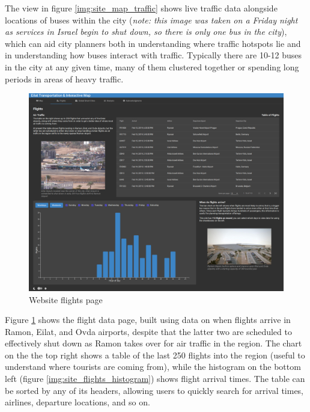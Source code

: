 \documentclass[12pt]{article}                               %
\begin{document}
The view in figure \ref{img:site_map_traffic} shows live traffic data alongside locations of buses within the city (\textit{note: this image was taken on a Friday night as services in Israel begin to shut down, so there is only one bus in the city}), which can aid city planners both in understanding where traffic hotspots lie and in understanding how buses interact with traffic. Typically there are 10-12 buses in the city at any given time, many of them clustered together or spending long periods in areas of heavy traffic.

\begin{figure}[H]
    \centering
    \includegraphics[width=1\textwidth]{images/site_flights.png}
    \caption{Website flights page}
    \label{img:site_flights}
\end{figure}

Figure \ref{img:site_flights} shows the flight data page, built using data on when flights arrive in Ramon, Eilat, and Ovda airports, despite that the latter two are scheduled to effectively shut down as Ramon takes over for air traffic in the region. The chart on the the top right shows a table of the last 250 flights into the region (useful to understand where tourists are coming from), while the histogram on the bottom left (figure \ref{img:site_flights_histogram}) shows flight arrival times. The table can be sorted by any of its headers, allowing users to quickly search for arrival times, airlines, departure locations, and so on.
\end{document}
